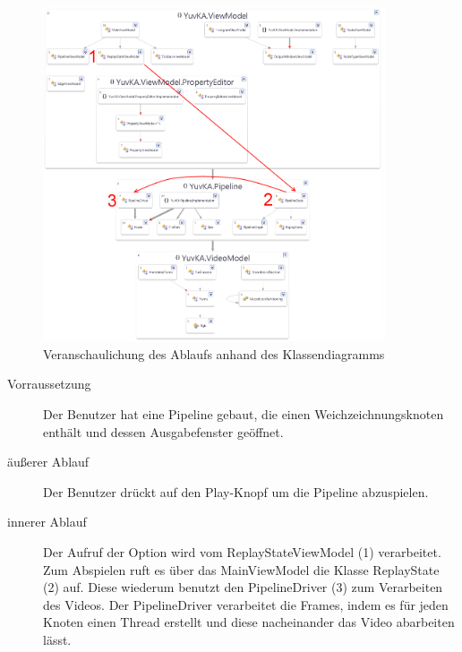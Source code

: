 \begin{figure}[h!]
\begin{center}
\includegraphics[width=0.9\textwidth]{Diagrams/visualization_TC3.png}
\end{center}
\caption{Veranschaulichung des Ablaufs anhand des Klassendiagramms}
\end{figure}
\begin{description}
	\item[Vorraussetzung] Der Benutzer hat eine Pipeline gebaut, die einen Weichzeichnungsknoten enthält und dessen Ausgabefenster geöffnet.
	\item[äußerer Ablauf] Der Benutzer drückt auf den Play-Knopf um die Pipeline abzuspielen.
	\item[innerer Ablauf] Der Aufruf der Option wird vom ReplayStateViewModel (1) verarbeitet. Zum Abspielen ruft es  über das MainViewModel die Klasse ReplayState (2) auf. Diese wiederum benutzt den PipelineDriver (3) zum Verarbeiten des Videos. Der PipelineDriver verarbeitet die Frames, indem es für jeden Knoten einen Thread erstellt und diese nacheinander das Video abarbeiten lässt.
\end{description}